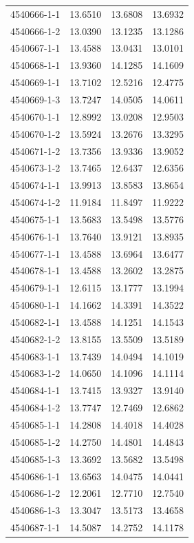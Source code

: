 \begin{longtable}{lrrr}
4540666-1-1 & 13.6510 & 13.6808 & 13.6932 \\
4540666-1-2 & 13.0390 & 13.1235 & 13.1286 \\
4540667-1-1 & 13.4588 & 13.0431 & 13.0101 \\
4540668-1-1 & 13.9360 & 14.1285 & 14.1609 \\
4540669-1-1 & 13.7102 & 12.5216 & 12.4775 \\
4540669-1-3 & 13.7247 & 14.0505 & 14.0611 \\
4540670-1-1 & 12.8992 & 13.0208 & 12.9503 \\
4540670-1-2 & 13.5924 & 13.2676 & 13.3295 \\
4540671-1-2 & 13.7356 & 13.9336 & 13.9052 \\
4540673-1-2 & 13.7465 & 12.6437 & 12.6356 \\
4540674-1-1 & 13.9913 & 13.8583 & 13.8654 \\
4540674-1-2 & 11.9184 & 11.8497 & 11.9222 \\
4540675-1-1 & 13.5683 & 13.5498 & 13.5776 \\
4540676-1-1 & 13.7640 & 13.9121 & 13.8935 \\
4540677-1-1 & 13.4588 & 13.6964 & 13.6477 \\
4540678-1-1 & 13.4588 & 13.2602 & 13.2875 \\
4540679-1-1 & 12.6115 & 13.1777 & 13.1994 \\
4540680-1-1 & 14.1662 & 14.3391 & 14.3522 \\
4540682-1-1 & 13.4588 & 14.1251 & 14.1543 \\
4540682-1-2 & 13.8155 & 13.5509 & 13.5189 \\
4540683-1-1 & 13.7439 & 14.0494 & 14.1019 \\
4540683-1-2 & 14.0650 & 14.1096 & 14.1114 \\
4540684-1-1 & 13.7415 & 13.9327 & 13.9140 \\
4540684-1-2 & 13.7747 & 12.7469 & 12.6862 \\
4540685-1-1 & 14.2808 & 14.4018 & 14.4028 \\
4540685-1-2 & 14.2750 & 14.4801 & 14.4843 \\
4540685-1-3 & 13.3692 & 13.5682 & 13.5498 \\
4540686-1-1 & 13.6563 & 14.0475 & 14.0441 \\
4540686-1-2 & 12.2061 & 12.7710 & 12.7540 \\
4540686-1-3 & 13.3047 & 13.5173 & 13.4658 \\
4540687-1-1 & 14.5087 & 14.2752 & 14.1178 \\

\end{longtable}
